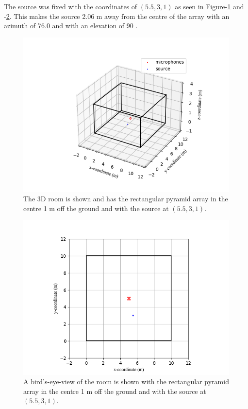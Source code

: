 \documentclass{report}
\begin{document}
The source was fixed with the coordinates of $(5.5,3,1)$ as seen in Figure-\ref{fig:pyramid_robot_room_3d} and -\ref{fig:pyramid_robot_room_2d}. This makes the source 2.06 \si{m} away from the centre of the array with an azimuth of 76.0 \si{\deg} and with an elevation of 90 \si{\deg}.

\begin{figure}[H]
\includegraphics[width=1\textwidth]{../Python/pyramid_robot/room_3d.png}
\centering
\caption{The 3D room is shown and has the rectangular pyramid array in the centre 1 \si{m} off the ground and with the source at $(5.5,3,1)$.}
\label{fig:pyramid_robot_room_3d}
\centering
\end{figure}

\begin{figure}[H]
\includegraphics[width=1\textwidth]{../Python/pyramid_robot/room_2d.png}
\centering
\caption{A bird's-eye-view of the room is shown with the rectangular pyramid array in the centre 1 \si{m} off the ground and with the source at $(5.5,3,1)$.}
\label{fig:pyramid_robot_room_2d}
\centering
\end{figure}
\end{document}
